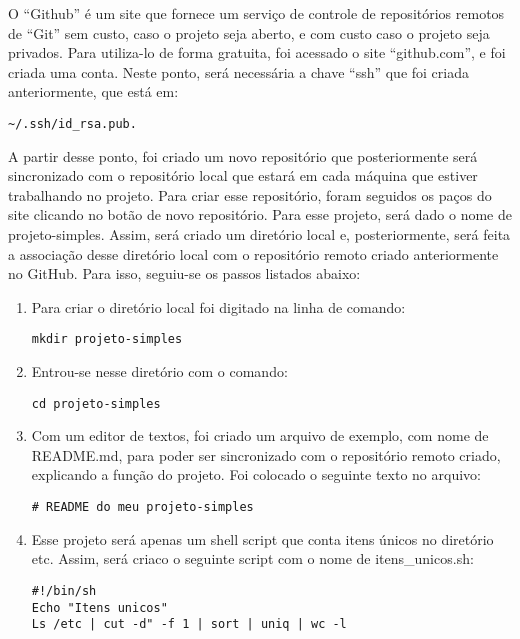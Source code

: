 O “Github” é um site que fornece um serviço de 
controle de repositórios remotos de “Git” sem custo,
caso o projeto seja aberto, e com custo caso o projeto 
seja privados. Para utiliza-lo de forma 
gratuita, foi acessado o site “github.com”, e foi criada 
uma conta. Neste ponto, será necessária a chave “ssh” que 
foi criada anteriormente, que está em:
      \begin{lstlisting}
~/.ssh/id_rsa.pub.
      \end{lstlisting}
A partir desse ponto, foi criado um novo repositório 
que posteriormente 
será sincronizado com o repositório local que estará em 
cada máquina que estiver trabalhando no projeto. Para criar 
esse repositório, foram  seguidos os paços do site clicando 
no botão de novo repositório. Para esse projeto, será dado 
o nome de projeto-simples. Assim, será criado um diretório 
local e, posteriormente, será feita a associação desse 
diretório local com o repositório remoto criado 
anteriormente no GitHub. Para isso, seguiu-se os 
passos listados abaixo:
\begin{enumerate}
   \item Para criar o diretório local foi digitado na linha de comando:
      \begin{lstlisting}
mkdir projeto-simples
      \end{lstlisting}
      
   \item Entrou-se nesse diretório com o comando:
      \begin{lstlisting}
cd projeto-simples
      \end{lstlisting}
   
   \item Com um editor de textos, foi criado um arquivo 
   de exemplo, com nome de README.md, para poder ser sincronizado 
   com o repositório remoto criado, explicando a função do projeto. 
   Foi colocado o seguinte texto no arquivo:
   
      \begin{lstlisting}
# README do meu projeto-simples
      \end{lstlisting}
   
   \item Esse projeto será apenas um shell script que conta 
   itens únicos no diretório \/etc. Assim, será criaco o 
   seguinte script com o nome de itens\_unicos.sh:
   
      \begin{lstlisting}
#!/bin/sh
Echo "Itens unicos"
Ls /etc | cut -d" -f 1 | sort | uniq | wc -l
      \end{lstlisting} 
 \end{enumerate}
